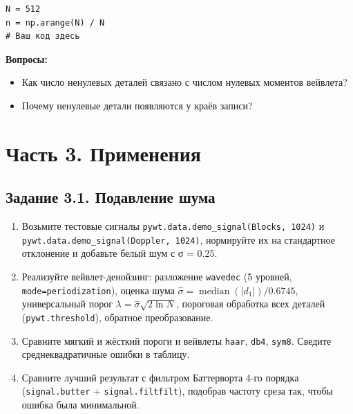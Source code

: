 \documentclass[12pt,a4paper,openany]{book}
\providecommand{\tightlist}{\setlength{\itemsep}{0pt}\setlength{\parskip}{0pt}}
\begin{document}
\begin{Verbatim}[fontsize=\small, breaklines, breakanywhere, frame=single, framesep=2mm]
N = 512
n = np.arange(N) / N
# Ваш код здесь
\end{Verbatim}

\textbf{Вопросы:}

\begin{itemize}
\tightlist
\item
  Как число ненулевых деталей связано с числом нулевых моментов вейвлета?
\item
  Почему ненулевые детали появляются у краёв записи?
\end{itemize}

\section*{Часть 3. Применения}

\subsection*{Задание 3.1. Подавление шума}

\begin{enumerate}
\def\labelenumi{\arabic{enumi}.}
\tightlist
\item
  Возьмите тестовые сигналы \texttt{pywt.\allowbreak{}data.\allowbreak{}demo\_\allowbreak{}signal(\allowbreak{}\textquotesingle{}\allowbreak{}Blocks\textquotesingle{}\allowbreak{},\allowbreak{}\ 1024)} и \texttt{pywt.\allowbreak{}data.\allowbreak{}demo\_\allowbreak{}signal(\allowbreak{}\textquotesingle{}\allowbreak{}Doppler\textquotesingle{}\allowbreak{},\allowbreak{}\ 1024)}, нормируйте их на стандартное отклонение и добавьте белый шум с σ = 0.25.
\item
  Реализуйте вейвлет-денойзинг: разложение \texttt{wavedec} (5 уровней, \texttt{mode=\allowbreak{}\textquotesingle{}\allowbreak{}periodization\textquotesingle{}\allowbreak{}}), оценка шума \(\hat\sigma = \operatorname{median}(|d_1|)/0.6745\), универсальный порог \(\lambda = \hat\sigma\sqrt{2\ln N}\), пороговая обработка всех деталей (\texttt{pywt.\allowbreak{}threshold}), обратное преобразование.
\item
  Сравните мягкий и жёсткий пороги и вейвлеты \texttt{haar}, \texttt{db4}, \texttt{sym8}. Сведите среднеквадратичные ошибки в таблицу.
\item
  Сравните лучший результат с фильтром Баттерворта 4-го порядка (\texttt{signal.\allowbreak{}butter} + \texttt{signal.\allowbreak{}filtfilt}), подобрав частоту среза так, чтобы ошибка была минимальной.
\end{enumerate}
\end{document}
